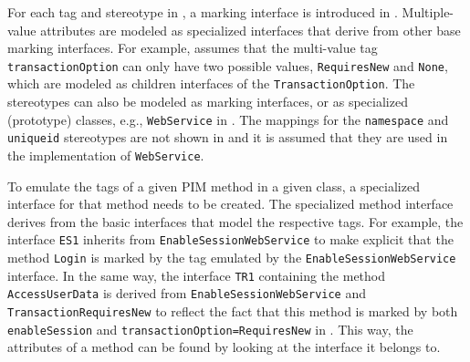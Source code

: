 For each tag and stereotype in , a marking interface is introduced in . Multiple-value attributes are modeled as specialized interfaces that derive from other base marking interfaces. For example,  assumes that the multi-value tag {\tt tran\-sactionOpti\-on} can only have two possible values, {\tt RequiresNew} and {\tt None}, which are modeled as children interfaces of the {\tt Tran\-sactionOpti\-on}. The stereotypes can also be modeled as marking interfaces, or as specialized (prototype) classes, e.g., {\tt WebSer\-vice} in . The mappings for the {\tt \flqq namespace\frqq} and {\tt \flqq uniqueid\frqq} stereotypes are not shown in  and it is assumed that they are used in the implementation of {\tt WebService}. 

To emulate the tags of a given PIM method in a given class, a specialized interface for that method needs to be created. The specialized method interface derives from the basic interfaces that model the respective tags. For example, the interface {\tt ES1} inherits from {\tt Ena\-bleSe\-ssionWebSer\-vi\-ce} to make explicit that the method {\tt Login} is marked by the tag emulated by the {\tt Ena\-bleSessi\-onWebSer\-vice} interface. In the same way, the interface {\tt TR1} containing the method {\tt AccessUserData} is derived from {\tt EnableSessionWebService} and {\tt Tran\-sa\-ctionRe\-quires\-New} to reflect the fact that this method is marked by both {\tt ena\-bleSe\-ssion} and {\tt tran\-sac\-tionOption=Re\-quire\-sNew} in . This way, the attributes of a method can be found by looking at the interface it belongs to.


